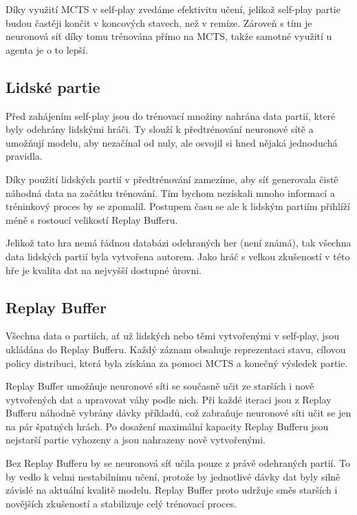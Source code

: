 Díky využití MCTS v self-play zvedáme efektivitu učení, jelikož self-play partie budou častěji končit v koncových stavech, než 
v remíze. Zároveň s tím je neuronová síť díky tomu trénována přímo na MCTS, takže samotné využití u agenta je o to lepší.

\subsection{Lidské partie}

Před zahájením self-play jsou do trénovací množiny nahrána data partií, které byly odehrány lidskými hráči. Ty slouží k předtrénování 
neuronové sítě a umožňují modelu, aby nezačínal od nuly, ale osvojil si hned nějaká jednoduchá pravidla.

Díky použití lidských partií v předtrénování zamezíme, aby síť generovala čistě náhodná data na začátku trénování. Tím bychom nezískali
mnoho informací a tréninkový proces by se zpomalil. Postupem času se ale k lidským partiím přihlíží méně s rostoucí velikostí 
Replay Bufferu.

Jelikož tato hra nemá řádnou databázi odehraných her (není známá), tak všechna data lidských partií byla vytvořena autorem.
Jako hráč s velkou zkušeností v této hře je kvalita dat na nejvyšší dostupné úrovni.

\subsection{Replay Buffer}

Všechna data o partiích, ať už lidských nebo těmi vytvořenými v self-play, jsou ukládána do Replay Bufferu. Každý záznam obsahuje reprezentaci stavu, cílovou
policy distribuci, která byla získána za pomoci MCTS a konečný výsledek partie.

Replay Buffer umožňuje neuronové síti se současně učit ze starších i nově vytvořených dat a upravovat váhy podle nich. Při každé iteraci jsou 
z Replay Bufferu náhodně vybrány dávky příkladů, což zabraňuje neuronové síti učit se jen na pár špatných hrách. Po dosažení maximální kapacity 
Replay Bufferu jsou nejstarší partie vyhozeny a jsou nahrazeny nově vytvořenými.

Bez Replay Bufferu by se neuronová síť učila pouze z právě odehraných partií. To by vedlo k velmi nestabilnímu učení, protože by jednotlivé 
dávky dat byly silně závislé na aktuální kvalitě modelu. Replay Buffer proto udržuje směs starších i novějších zkušeností a stabilizuje celý 
trénovací proces.

